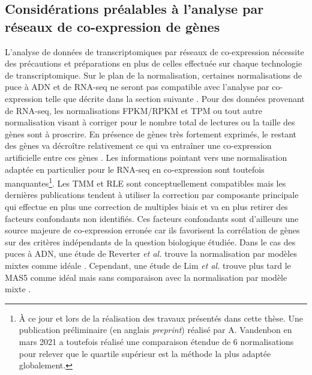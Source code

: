 \subsection{Considérations préalables à l'analyse par réseaux de co-expression de gènes}

L'analyse de données de transcriptomiques par réseaux de co-expression nécessite des précautions et préparations en plus de celles effectuée sur chaque technologie de transcriptomique. Sur le plan de la normalisation, certaines normalisations de puce à ADN et de RNA-seq ne seront pas compatible avec l'analyse par co-expression telle que décrite dans la section suivante \cite{Zhang2005a}. Pour des données provenant de RNA-seq, les normalisations FPKM/RPKM et TPM ou tout autre normalisation visant à corriger pour le nombre total de lectures ou la taille des gènes sont à proscrire. En présence de gènes très fortement exprimés, le restant des gènes va décroître relativement ce qui va entraîner une co-expression artificielle entre ces gènes \cite{Spiko2017thesis}. Les informations pointant vers une normalisation adaptée en particulier pour le RNA-seq en co-expression sont toutefois manquantes\footnote{À ce jour et lors de la réalisation des travaux présentés dans cette thèse. Une publication préliminaire (en anglais \textit{preprint}) réalisé par A. Vandenbon en mars 2021 \cite{Vandenbon2021Mar} a toutefois réalisé une comparaison étendue de 6 normalisations pour relever que le quartile supérieur est la méthode la plus adaptée globalement.}. Les TMM et RLE sont conceptuellement compatibles mais les dernières publications tendent à utiliser la correction par composante principale \cite{Parsana2019} qui effectue en plus une correction de multiples biais et va en plus retirer des facteurs confondants non identifiés. Ces facteurs confondants sont d'ailleurs une source majeure de co-expression erronée car ils favorisent la corrélation de gènes sur des critères indépendants de la question biologique étudiée. Dans le cas des puces à ADN, une étude de Reverter \textit{et al.} trouve la normalisation par modèles mixtes comme idéale \cite{Reverter2005Apr}. Cependant, une étude de Lim \textit{et al.} trouve plus tard le MAS5 comme idéal mais sans comparaison avec la normalisation par modèle mixte \cite{Lim2007Jul}.

